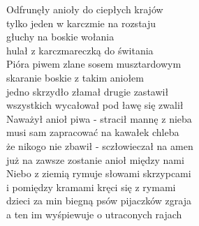 Odfrunęły anioły do ciepłych krajów \\
tylko jeden w karczmie na rozstaju \\
głuchy na boskie wołania \tab{} \\
hulał z karczmareczką do świtania  \\
\hops
Pióra piwem zlane sosem musztardowym  \\
skaranie boskie z takim aniołem   \\
jedno skrzydło złamał drugie zastawił  \\
wszystkich wycałował pod ławę się zwalił  \\
\hops
Naważył anioł piwa - stracił mannę z nieba\\
musi sam zapracować na kawałek chleba\\
że nikogo nie zbawił - sczłowieczał na amen\\
już na zawsze zostanie anioł między nami\\
\hops
Niebo z ziemią rymuje słowami skrzypcami\\
i pomiędzy kramami kręci się z rymami\\
dzieci za min biegną psów pijaczków zgraja\\
a ten im wyśpiewuje o utraconych rajach\\
